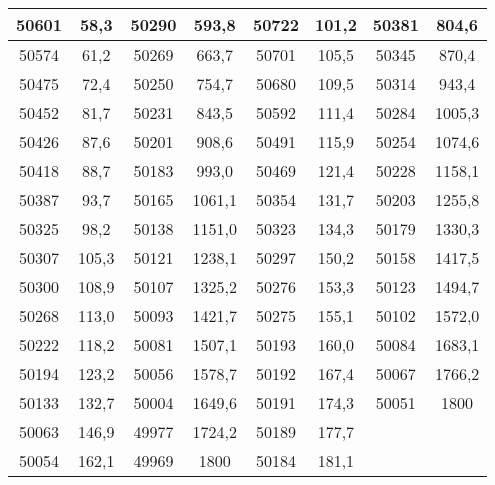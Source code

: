 \documentclass[11pt]{article}
\begin{document}
{{\begin{tabular}{|c|c|c|c|c|c|c|c|}
            \hline 
            50601 & 58,3 & \multicolumn{1}{c|}{50290} & 593,8 & 50722 & 101,2 & \multicolumn{1}{c|}{50381} & \multicolumn{1}{c|}{804,6}\tabularnewline
            \hline 
            50574 & 61,2 & \multicolumn{1}{c|}{50269} & 663,7 & 50701 & 105,5 & \multicolumn{1}{c|}{50345} & \multicolumn{1}{c|}{870,4}\tabularnewline
            \hline 
            50475 & 72,4 & \multicolumn{1}{c|}{50250} & 754,7 & 50680 & 109,5 & \multicolumn{1}{c|}{50314} & \multicolumn{1}{c|}{943,4}\tabularnewline
            \hline 
            50452 & 81,7 & \multicolumn{1}{c|}{50231} & 843,5 & 50592 & 111,4 & \multicolumn{1}{c|}{50284} & \multicolumn{1}{c|}{1005,3}\tabularnewline
            \hline 
            50426 & 87,6 & \multicolumn{1}{c|}{50201} & 908,6 & 50491 & 115,9 & \multicolumn{1}{c|}{50254} & \multicolumn{1}{c|}{1074,6}\tabularnewline
            \hline 
            50418 & 88,7 & \multicolumn{1}{c|}{50183} & 993,0 & 50469 & 121,4 & \multicolumn{1}{c|}{50228} & \multicolumn{1}{c|}{1158,1}\tabularnewline
            \hline 
            50387 & 93,7 & \multicolumn{1}{c|}{50165} & 1061,1 & 50354 & 131,7 & \multicolumn{1}{c|}{50203} & \multicolumn{1}{c|}{1255,8}\tabularnewline
            \hline 
            50325 & 98,2 & \multicolumn{1}{c|}{50138} & 1151,0 & 50323 & 134,3 & \multicolumn{1}{c|}{50179} & \multicolumn{1}{c|}{1330,3}\tabularnewline
            \hline 
            50307 & 105,3 & \multicolumn{1}{c|}{50121} & 1238,1 & 50297 & 150,2 & \multicolumn{1}{c|}{50158} & \multicolumn{1}{c|}{1417,5}\tabularnewline
            \hline 
            50300 & 108,9 & \multicolumn{1}{c|}{50107} & 1325,2 & 50276 & 153,3 & \multicolumn{1}{c|}{50123} & \multicolumn{1}{c|}{1494,7}\tabularnewline
            \hline 
            50268 & 113,0 & \multicolumn{1}{c|}{50093} & 1421,7 & 50275 & 155,1 & \multicolumn{1}{c|}{50102} & \multicolumn{1}{c|}{1572,0}\tabularnewline
            \hline 
            50222 & 118,2 & \multicolumn{1}{c|}{50081} & 1507,1 & 50193 & 160,0 & \multicolumn{1}{c|}{50084} & \multicolumn{1}{c|}{1683,1}\tabularnewline
            \hline 
            50194 & 123,2 & \multicolumn{1}{c|}{50056} & 1578,7 & 50192 & 167,4 & \multicolumn{1}{c|}{50067} & \multicolumn{1}{c|}{1766,2}\tabularnewline
            \hline 
            50133 & 132,7 & \multicolumn{1}{c|}{50004} & 1649,6 & 50191 & 174,3 & \multicolumn{1}{c|}{50051} & \multicolumn{1}{c|}{1800}\tabularnewline
            \hline 
            50063 & 146,9 & \multicolumn{1}{c|}{49977} & 1724,2 & 50189 & 177,7 &  & \tabularnewline
            \cline{1-6} 
            50054 & 162,1 & \multicolumn{1}{c|}{49969} & 1800 & 50184 & 181,1 &  & \tabularnewline

\end{tabular}}}
\end{document}
